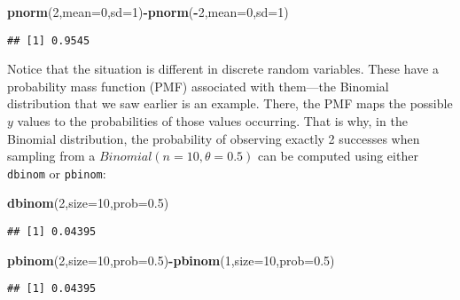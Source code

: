 \documentclass[12pt,]{krantz}
\newenvironment{Shaded}{\begin{snugshade}}{\end{snugshade}}
\newcommand{\DataTypeTok}[1]{\textcolor[rgb]{0.13,0.29,0.53}{#1}}
\newcommand{\DecValTok}[1]{\textcolor[rgb]{0.00,0.00,0.81}{#1}}
\newcommand{\FloatTok}[1]{\textcolor[rgb]{0.00,0.00,0.81}{#1}}
\newcommand{\KeywordTok}[1]{\textcolor[rgb]{0.13,0.29,0.53}{\textbf{#1}}}
\newcommand{\NormalTok}[1]{#1}
\newcommand{\OperatorTok}[1]{\textcolor[rgb]{0.81,0.36,0.00}{\textbf{#1}}}
\begin{document}
\begin{Shaded}
\begin{Highlighting}[]
\KeywordTok{pnorm}\NormalTok{(}\DecValTok{2}\NormalTok{,}\DataTypeTok{mean=}\DecValTok{0}\NormalTok{,}\DataTypeTok{sd=}\DecValTok{1}\NormalTok{)}\OperatorTok{-}\KeywordTok{pnorm}\NormalTok{(}\OperatorTok{-}\DecValTok{2}\NormalTok{,}\DataTypeTok{mean=}\DecValTok{0}\NormalTok{,}\DataTypeTok{sd=}\DecValTok{1}\NormalTok{)}
\end{Highlighting}
\end{Shaded}

\begin{verbatim}
## [1] 0.9545
\end{verbatim}

Notice that the situation is different in discrete random variables. These have a probability mass function (PMF) associated with them---the Binomial distribution that we saw earlier is an example. There, the PMF maps the possible \(y\) values to the probabilities of those values occurring. That is why, in the Binomial distribution, the probability of observing exactly 2 successes when sampling from a \(Binomial(n=10,\theta=0.5)\) can be computed using either \texttt{dbinom} or \texttt{pbinom}:

\begin{Shaded}
\begin{Highlighting}[]
\KeywordTok{dbinom}\NormalTok{(}\DecValTok{2}\NormalTok{,}\DataTypeTok{size=}\DecValTok{10}\NormalTok{,}\DataTypeTok{prob=}\FloatTok{0.5}\NormalTok{)}
\end{Highlighting}
\end{Shaded}

\begin{verbatim}
## [1] 0.04395
\end{verbatim}

\begin{Shaded}
\begin{Highlighting}[]
\KeywordTok{pbinom}\NormalTok{(}\DecValTok{2}\NormalTok{,}\DataTypeTok{size=}\DecValTok{10}\NormalTok{,}\DataTypeTok{prob=}\FloatTok{0.5}\NormalTok{)}\OperatorTok{-}\KeywordTok{pbinom}\NormalTok{(}\DecValTok{1}\NormalTok{,}\DataTypeTok{size=}\DecValTok{10}\NormalTok{,}\DataTypeTok{prob=}\FloatTok{0.5}\NormalTok{)}
\end{Highlighting}
\end{Shaded}

\begin{verbatim}
## [1] 0.04395
\end{verbatim}
\end{document}
